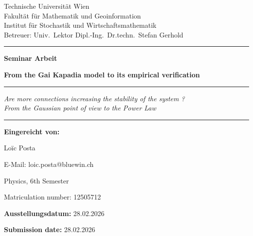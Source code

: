 \documentclass[a4paper,12pt,twoside]{article}
\makeatletter
\newcommand{\betreuer}{Univ.\ Lektor Dipl.-Ing.\ Dr.techn.\ Stefan Gerhold}
\newcommand{\titel}{From the Gai Kapadia model to its empirical verification}
\newcommand{\untertitel}{Are more connections increasing the stability of the system ? \\ From the Gaussian point of view to the Power Law}
\newcommand{\autor}{Loïc Posta}
\newcommand{\telefon}{+41 78 685 06 97}
\newcommand{\email}{loic.posta@bluewin.ch}
\newcommand{\studium}{Physics, 6th Semester}
\newcommand{\abgabe}{28.02.2026}
\newcommand{\ausgabe}{28.02.2026}
\newcommand{\matrikel}{12505712}
\makeatother
\begin{document}
\setcounter{page}{1}

\begin{titlepage}
\setlength{\parindent}{0pt}
\thispagestyle{plain}

\begin{center}
    \large Technische Universität Wien\\
    \large Fakultät für Mathematik und Geoinformation\\
    \large Institut für Stochastik und Wirtschaftsmathematik\\
    \large Betreuer: \betreuer

    \vspace{1.0cm}
    \rule{\linewidth}{0.8pt}

    \vspace{0.9cm}
    {\LARGE \textbf{Seminar Arbeit}\par}

    \vspace{0.9cm}
    {\LARGE \textbf{\titel}\par}

    \vspace{0.25cm}
    \rule{0.6cm}{0.5pt}\par

\vspace{0.25cm}
{\large\textit{\untertitel}\par}

    \vspace{0.9cm}
    \rule{\linewidth}{0.8pt}
\end{center}

\vspace{1.2cm}

\noindent
\begin{minipage}[t]{0.64\textwidth}
    \textbf{Eingereicht von:}\par
    \autor\par
    E-Mail: \email\par
    \studium\par
    Matriculation number: \matrikel
\end{minipage}
\hfill
\begin{minipage}[t]{0.32\textwidth}
    \raggedleft
    \textbf{Ausstellungsdatum:} \ausgabe\par
    \textbf{Submission date:} \abgabe
\end{minipage}

\vfill

\hfill

\end{titlepage}
\restoregeometry
\clearpage
\tableofcontents
\clearpage
\end{document}
